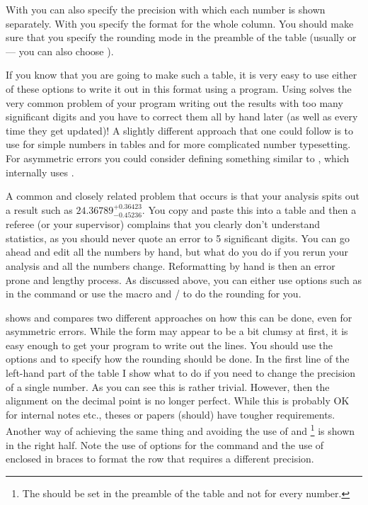 With  you can also specify the precision with which each
number is shown separately. 
With  you specify the format for the whole column.
You should make sure
that you specify the rounding mode in the preamble of the table (usually
 or  --- you can also choose ).

If you know that you are going to make such a table, it is very easy
to use either of these options to write it out in this format using a
program. Using  solves the very common problem of your
program writing out the results with too many significant digits and
you have to correct them all by hand later (as well as every time they
get updated)!  A slightly different approach that one could follow is
to use  for simple numbers in tables and  for
more complicated number typesetting.  For asymmetric errors you could
consider defining something similar to , which
internally uses .

A common and closely related problem that occurs is that your analysis
spits out a result such as \(24.36789^{+0.36423}_{-0.45236}\). You copy
and paste this into a table and then a referee (or your supervisor)
complains that you clearly don't understand statistics, as you should
never quote an error to 5 significant digits. You can go ahead and
edit all the numbers by hand, but what do you do if you rerun your
analysis and all the numbers change. Reformatting by hand is then an
error prone and lengthy process. As discussed above, you can either
use options such as  in the  command or use the macro
 and / to do the
rounding for you.

 shows and compares two different approaches
on how this can be done, even for asymmetric errors. While the form
may appear to be a bit clumsy at first, it is easy enough to get your
program to write out the lines. 
You should use the options  and
 to specify how the rounding should be done.
In the first line of the left-hand part of
the table I show what to do if you need to change the precision of a
single number.  As you can see this is rather trivial. However, then
the alignment on the decimal point is no longer perfect. While this is
probably OK for internal notes etc., theses or papers (should) have
tougher requirements.
Another way of achieving the same thing and
avoiding the use of  and
\footnote{%
  The  should be set in the preamble of the table and
  not for every number.}
is shown in the right half.
Note the use of options for the  command
and the use of  enclosed in braces
to format the row that requires a different precision.

